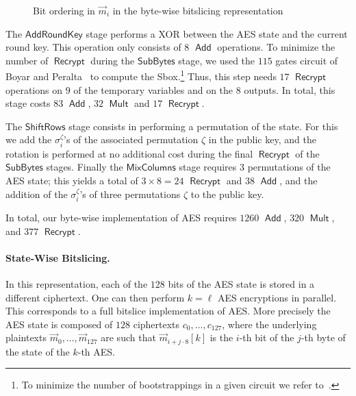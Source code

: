 \documentclass{llncs}
\DeclareMathOperator{\Recrypt}{\ensuremath{\mathsf{Recrypt}}}
\DeclareMathOperator{\Add}{\ensuremath{\mathsf{Add}}}
\DeclareMathOperator{\Mult}{\ensuremath{\mathsf{Mult}}}
\newcommand*\AddRoundKey{\ensuremath{\mathsf{AddRoundKey}}}
\newcommand*\ShiftRows{\ensuremath{\mathsf{ShiftRows}}}
\newcommand*\SubBytes{\ensuremath{\mathsf{SubBytes}}}
\newcommand*\MixColumns{\ensuremath{\mathsf{MixColumns}}}
\newcommand*\bwbs{byte-wise bitslicing\xspace}
\begin{document}
\begin{figure}[bt]
  \caption{Bit ordering in $\vec m_i$ in the \bwbs{} representation}
  \label{fig:bwbs-state}
\end{figure}

The $\AddRoundKey$ stage performs a XOR between the AES state and the
current round key. This operation only consists of $8$ $\Add$
operations.  
To minimize the
number of $\Recrypt$ during the $\SubBytes$ stage, we used the $115$ gates circuit of
Boyar and Peralta~\cite{BP2010} to compute the Sbox.\footnote{To minimize the number of bootstrappings in a given circuit we refer to~\cite{LP2013}.} 
Thus, this step needs $17$
$\Recrypt$ operations
on $9$ of
the temporary variables and on the $8$ outputs. In total, this stage
costs $83$ $\Add$, $32$ $\Mult$ and $17$
$\Recrypt$.

The $\ShiftRows$ stage consists in performing a permutation of the
state. For this we add the $\sigma^\zeta_i$'s of the associated
permutation $\zeta$ in the public key, and the rotation is performed 
at no additional cost during the final $\Recrypt$ of the $\SubBytes$
stages. 
Finally the $\MixColumns$ stage requires $3$ permutations of the AES
state; this yields a total of $3\times 8=24$ $\Recrypt$
and $38$ $\Add$, and the addition of the $\sigma^\zeta_i$'s of
three permutations $\zeta$ to the public key. 

In total, our byte-wise implementation of AES requires  $1260$ $\Add$,
 $320$ $\Mult$, and $377$ $\Recrypt$.

\paragraph{State-Wise Bitslicing.} In this representation, each of the
$128$ bits of the AES state is stored in a different ciphertext. One
can then perform $k=\ell$ AES encryptions in parallel. This
corresponds to a full bitslice implementation of AES.
More precisely
the AES state is composed of $128$ ciphertexts $c_0,\ldots,c_{127}$,
where the underlying plaintexts $\vec m_0,\ldots,\vec m_{127}$ are
such that $\vec m_{i+j\cdot 8}[k]$ is the $i$-th bit of the $j$-th
byte of the state of the $k$-th AES.
\end{document}
